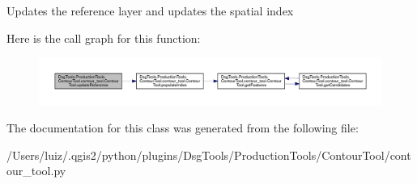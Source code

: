 \begin{DoxyVerb}Updates the reference layer and updates the spatial index
\end{DoxyVerb}
 Here is the call graph for this function\+:
\nopagebreak
\begin{figure}[H]
\begin{center}
\leavevmode
\includegraphics[width=350pt]{class_dsg_tools_1_1_production_tools_1_1_contour_tool_1_1contour__tool_1_1_contour_tool_a6a7b5ead3d76e267b30cfff2dec155c1_cgraph}
\end{center}
\end{figure}


The documentation for this class was generated from the following file\+:\begin{DoxyCompactItemize}
\item 
/\+Users/luiz/.\+qgis2/python/plugins/\+Dsg\+Tools/\+Production\+Tools/\+Contour\+Tool/contour\+\_\+tool.\+py\end{DoxyCompactItemize}
